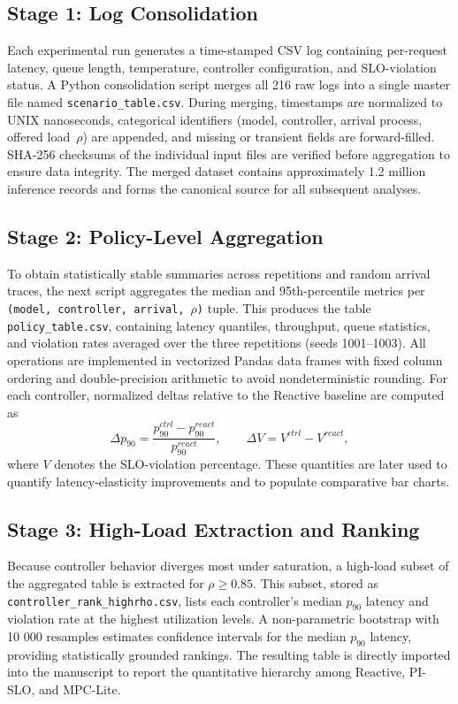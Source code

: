 \documentclass[acmsmall]{acmart}
\begin{document}
\subsection{Stage 1: Log Consolidation}

Each experimental run generates a time-stamped CSV log containing per-request latency, queue length, temperature, controller configuration, and SLO-violation status.  
A Python consolidation script merges all 216 raw logs into a single master file named \texttt{scenario\_table.csv}.  
During merging, timestamps are normalized to UNIX nanoseconds, categorical identifiers (model, controller, arrival process, offered load~$\rho$) are appended, and missing or transient fields are forward-filled.  
SHA-256 checksums of the individual input files are verified before aggregation to ensure data integrity.  
The merged dataset contains approximately 1.2 million inference records and forms the canonical source for all subsequent analyses.

\subsection{Stage 2: Policy-Level Aggregation}

To obtain statistically stable summaries across repetitions and random arrival traces, the next script aggregates the median and 95th-percentile metrics per \texttt{(model, controller, arrival, $\rho$)} tuple.  
This produces the table \texttt{policy\_table.csv}, containing latency quantiles, throughput, queue statistics, and violation rates averaged over the three repetitions (seeds 1001–1003).  
All operations are implemented in vectorized Pandas data frames with fixed column ordering and double-precision arithmetic to avoid nondeterministic rounding.  
For each controller, normalized deltas relative to the Reactive baseline are computed as
\[
\Delta p_{90} = \frac{p_{90}^{ctrl}-p_{90}^{react}}{p_{90}^{react}}, \qquad
\Delta V = V^{ctrl}-V^{react},
\]
where $V$ denotes the SLO-violation percentage.  
These quantities are later used to quantify latency-elasticity improvements and to populate comparative bar charts.

\subsection{Stage 3: High-Load Extraction and Ranking}

Because controller behavior diverges most under saturation, a high-load subset of the aggregated table is extracted for $\rho\ge0.85$.  
This subset, stored as \texttt{controller\_rank\_highrho.csv}, lists each controller’s median \(p_{90}\) latency and violation rate at the highest utilization levels.  
A non-parametric bootstrap with 10 000 resamples estimates confidence intervals for the median \(p_{90}\) latency, providing statistically grounded rankings.  
The resulting table is directly imported into the manuscript to report the quantitative hierarchy among Reactive, PI-SLO, and MPC-Lite.
\end{document}
